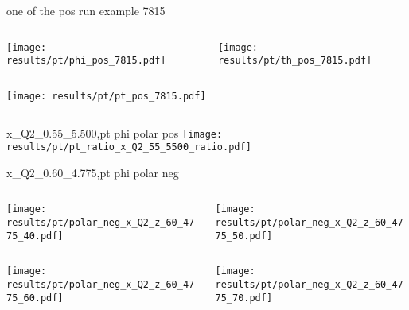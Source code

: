 \begin{frame}{one of the pos run example 7815}
\begin{columns}
\begin{column}[T]{0.5\textwidth}
\texttt{[image: results/pt/phi\_pos\_7815.pdf]}
\end{column}
\begin{column}[T]{0.5\textwidth}
\texttt{[image: results/pt/th\_pos\_7815.pdf]}
\end{column}
\end{columns}
\begin{columns}
\begin{column}[T]{0.5\textwidth}
\texttt{[image: results/pt/pt\_pos\_7815.pdf]}
\end{column}
\begin{column}[T]{0.5\textwidth}
\end{column}
\end{columns}
\end{frame}
\begin{frame}{x\_Q2\_0.55\_5.500,pt phi polar pos}
\texttt{[image: results/pt/pt\_ratio\_x\_Q2\_55\_5500\_ratio.pdf]}
\end{frame}
\begin{frame}{x\_Q2\_0.60\_4.775,pt phi polar neg}
\begin{columns}
\begin{column}[T]{0.5\textwidth}
\texttt{[image: results/pt/polar\_neg\_x\_Q2\_z\_60\_4775\_40.pdf]}
\end{column}
\begin{column}[T]{0.5\textwidth}
\texttt{[image: results/pt/polar\_neg\_x\_Q2\_z\_60\_4775\_50.pdf]}
\end{column}
\end{columns}
\begin{columns}
\begin{column}[T]{0.5\textwidth}
\texttt{[image: results/pt/polar\_neg\_x\_Q2\_z\_60\_4775\_60.pdf]}
\end{column}
\begin{column}[T]{0.5\textwidth}
\texttt{[image: results/pt/polar\_neg\_x\_Q2\_z\_60\_4775\_70.pdf]}
\end{column}
\end{columns}
\end{frame}
